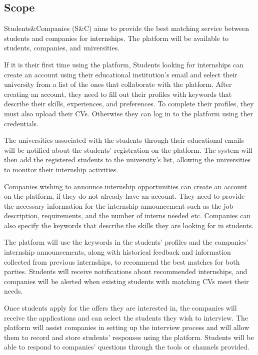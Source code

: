 \subsection{Scope}
\label{subsec:scope}
Students\&Companies (S\&C) aims to provide the best matching service between students and companies for internships. The platform will be available
to students, companies, and universities.

If it is their first time using the platform, Students looking for internships can create an account using their educational institution's email and select their university from a list of the ones that collaborate with the platform. 
After creating an account, they need to fill out their profiles with keywords that describe their skills, experiences, and preferences. To complete
their profiles, they must also upload their CVs.
Otherwise they can log in to the platform using ther credentials.

The universities associated with the students through their educational emails will be notified about the students' registration on the platform. 
The system will then add the registered students to the university’s list, allowing the universities to monitor their internship activities.

Companies wishing to announce internship opportunities can create an account on the platform, if they do not already have an account. They need to
provide the necessary information for the internship announcement such as the job description, requirements, and the number of interns needed etc. 
Companies can also specify the keywords that describe the skills they are looking for in students.

The platform will use the keywords in the students' profiles and the companies' internship announcements, along with historical feedback and 
information collected from previous internships, to recommend the best matches for both parties. Students will receive notifications about 
recommended internships, and companies will be alerted when existing students with matching CVs meet their needs.

Once students apply for the offers they are interested in, the companies will receive the applications and can select the students they wish 
to interview. The platform will assist companies in setting up the interview process and will allow them to record and store students' responses 
using the platform. Students will be able to respond to companies' questions through the tools or channels provided.

